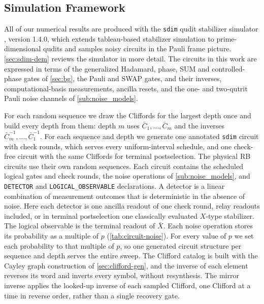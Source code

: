 \subsection{Simulation Framework}
\label{sub:sim_framework}

All of our numerical results are produced with the \texttt{sdim} qudit stabilizer simulator \cite{sdim}, version 1.4.0, which extends tableau-based stabilizer simulation to prime-dimensional qudits and samples noisy circuits in the Pauli frame picture. \autoref{sec:sdim-dem} reviews the simulator in more detail. The circuits in this work are expressed in terms of the generalized Hadamard, phase, SUM and controlled-phase gates of \autoref{sec:bg}, the Pauli and SWAP gates, and their inverses, computational-basis measurements, ancilla resets, and the one- and two-qutrit Pauli noise channels of \autoref{sub:noise_models}.

For each random sequence we draw the Cliffords for the largest depth once and build every depth from them: depth $m$ uses $\bar C_1, \dots, \bar C_m$ and the inverses $\bar C_m^{-1}, \dots, \bar C_1^{-1}$. For each sequence and depth we generate one annotated \texttt{sdim} circuit with check rounds, which serves every uniform-interval schedule, and one check-free circuit with the same Cliffords for terminal postselection. The physical RB circuits use their own random sequences. Each circuit contains the scheduled logical gates and check rounds, the noise operations of \autoref{sub:noise_models}, and \texttt{DETECTOR} and \texttt{LOGICAL\_OBSERVABLE} declarations. A detector is a linear combination of measurement outcomes that is deterministic in the absence of noise. Here each detector is one ancilla readout of one check round, relay readouts included, or in terminal postselection one classically evaluated $X$-type stabilizer. The logical observable is the terminal readout of $\bar X$. Each noise operation stores its probability as a multiple of $p$ (\autoref{tab:circuit-noise}). For every value of $p$ we set each probability to that multiple of $p$, so one generated circuit structure per sequence and depth serves the entire sweep. The Clifford catalog is built with the Cayley graph construction of \autoref{sec:clifford-gen}, and the inverse of each element reverses its word and inverts every symbol, without resynthesis. The mirror inverse applies the looked-up inverse of each sampled Clifford, one Clifford at a time in reverse order, rather than a single recovery gate.

